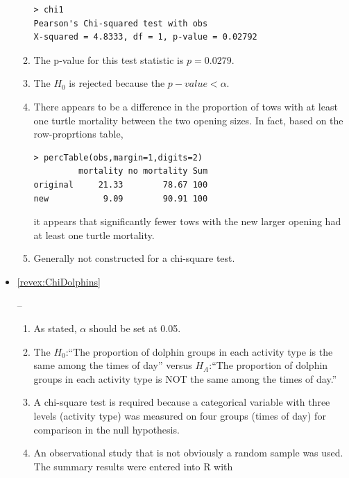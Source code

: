 \documentclass[10pt,openany]{book}\usepackage[]{graphicx}\usepackage[]{color}
\makeatletter
\newenvironment{kframe}{%
 \def\at@end@of@kframe{}%
 \ifinner\ifhmode%
  \def\at@end@of@kframe{\end{minipage}}%
  \begin{minipage}{\columnwidth}%
 \fi\fi%
 \def\FrameCommand##1{\hskip\@totalleftmargin \hskip-\fboxsep
 \colorbox{shadecolor}{##1}\hskip-\fboxsep
     \hskip-\linewidth \hskip-\@totalleftmargin \hskip\columnwidth}%
 \MakeFramed {\advance\hsize-\width
   \@totalleftmargin\z@ \linewidth\hsize
   \@setminipage}}%
 {\par\unskip\endMakeFramed%
 \at@end@of@kframe}
\newenvironment{knitrout}{}{} %
\makeatother
\begin{document}
\begin{itemize}
\begin{enumerate}
\begin{knitrout}
\begin{kframe}
\begin{verbatim}
> chi1
Pearson's Chi-squared test with obs 
X-squared = 4.8333, df = 1, p-value = 0.02792
\end{verbatim}
\end{kframe}
\end{knitrout}
      \item The p-value for this test statistic is $p=0.0279$.
      \item The $H_{0}$ is rejected because the $p-value <\alpha$.
      \item There appears to be a difference in the proportion of tows with at least one turtle mortality between the two opening sizes.  In fact, based on the row-proprtions table,
\begin{knitrout}
\color{fgcolor}\begin{kframe}
\begin{verbatim}
> percTable(obs,margin=1,digits=2)
         mortality no mortality Sum
original     21.33        78.67 100
new           9.09        90.91 100
\end{verbatim}
\end{kframe}
\end{knitrout}
it appears that significantly fewer tows with the new larger opening had at least one turtle mortality.
      \item Generally not constructed for a chi-square test.
    \end{enumerate}
  \item \hypertarget{ans:ChiDolphins}{\ref{revex:ChiDolphins}} --
    \begin{enumerate}
      \item As stated, $\alpha$ should be set at 0.05.
      \item The $H_{0}$:``The proportion of dolphin groups in each activity type is the same among the times of day'' versus $H_{A}$:``The proportion of dolphin groups in each activity type is NOT the same among the times of day.''
      \item A chi-square test is required because a categorical variable with three levels (activity type) was measured on four groups (times of day) for comparison in the null hypothesis.
      \item An observational study that is not obviously a random sample was used.  The summary results were entered into R with
\begin{knitrout}
\color{fgcolor}\begin{kframe}

\end{kframe}
\end{knitrout}
\end{enumerate}
\end{itemize}
\end{document}
